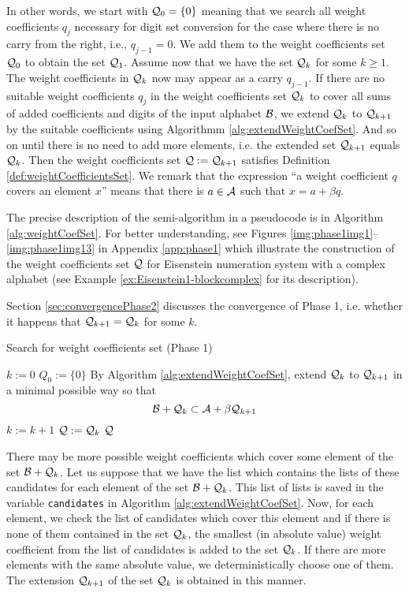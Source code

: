 In other words, we start with $\mathcal{Q}_0=\{0\}$ meaning that we search all weight coefficients $q_j$ necessary for digit set conversion for the case where there is no carry from the right, i.e., $q_{j-1}=0$. We add them to the weight coefficients set $\mathcal{Q}_0$ to obtain the set $\mathcal{Q}_1$. Assume now that we have the set $\mathcal{Q}_k$ for some $k\geq 1$. The weight coefficients in $\mathcal{Q}_k$ now may appear as a carry $q_{j-1}$. If there are no suitable weight coefficients $q_j$ in the weight coefficients set $\mathcal{Q}_k$ to cover all sums of added coefficients and digits of the input alphabet $\mathcal{B}$, we extend $\mathcal{Q}_k$ to $\mathcal{Q}_{k+1}$ by the suitable coefficients using Algorithmm \ref{alg:extendWeightCoefSet}. And so on until there is no need to add more elements, i.e. the extended set $\mathcal{Q}_{k+1}$ equals $\mathcal{Q}_k$. Then the weight coefficients set $\mathcal{Q}:=\mathcal{Q}_{k+1}$ satisfies Definition \ref{def:weightCoefficientsSet}. We remark that the expression ``a weight coefficient $q$ covers an element $x$'' means that there is $a \in \mathcal{A}$ such that $x=a + \beta q$.
    
The precise description of the semi-algorithm in a pseudocode is in Algorithm \ref{alg:weightCoefSet}. For better understanding, see Figures \ref{img:phase1img1}--\ref{img:phase1img13} in Appendix \ref{app:phase1} which illustrate the construction of the weight coefficients set $\mathcal{Q}$ for Eisenstein numeration system with a complex alphabet (see Example \ref{ex:Eisenstein1-blockcomplex} for its description). 

Section \ref{sec:convergencePhase2} discusses the convergence of Phase 1, i.e. whether it happens that  $\mathcal{Q}_{k+1}=\mathcal{Q}_k$ for some  $k$.
    
\begin{algorithm}
  \caption{Search for weight coefficients set (Phase 1)}
    \label{alg:weightCoefSet}
  \begin{algorithmic}[1]
    \STATE $k:=0$ 
    \STATE $Q_0:=\{0\}$
    \REPEAT
     \STATE  By Algorithm \ref{alg:extendWeightCoefSet}, extend $\mathcal{Q}_k$ to $\mathcal{Q}_{k+1}$ in a minimal possible way so that $$\mathcal{B}+ \mathcal{Q}_k \subset \mathcal{A} + \beta \mathcal{Q}_{k+1}$$
     \vspace{-20pt}
      \STATE  $k:=k+1$
      \STATE $\mathcal{Q}:=\mathcal{Q}_k$
    \RETURN $\mathcal{Q}$
  \end{algorithmic}
\end{algorithm}

There may be more possible weight coefficients which cover some element of the set $\mathcal{B}+ \mathcal{Q}_k$. Let us suppose that we have the list which contains the lists of these candidates for each element of the set $\mathcal{B}+ \mathcal{Q}_k$. This list of lists is saved in the variable \verb+candidates+ in Algorithm \ref{alg:extendWeightCoefSet}. Now, for each element, we check the list of candidates which cover this element and if there is none of them contained in the set $\mathcal{Q}_k$, the smallest (in absolute value) weight coefficient from the list of candidates is added to the set $\mathcal{Q}_k$. If there are more elements with the same absolute value, we deterministically choose one of them. The extension $\mathcal{Q}_{k+1}$ of the set $\mathcal{Q}_k$ is obtained in this manner.   

